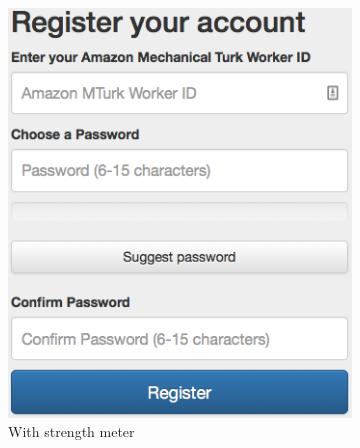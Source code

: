 \begin{figure}[H]
{\begin{subfigure}[t]{0.4\textwidth}
            \includegraphics[width=\textwidth]{Images/1-register-meter}
            \caption{With strength meter}
            \label{fig:reg-str}
        \end{subfigure}
        ~
        \begin{subfigure}[t]{0.4\textwidth}

\end{subfigure}}
\end{figure}

